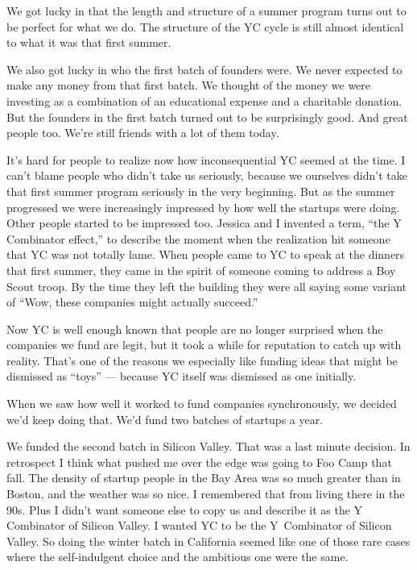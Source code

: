 \documentclass[12pt]{book}
\begin{document}
We got lucky in that the length and structure of a summer program turns
out to be perfect for what we do. The structure of the YC cycle is still
almost identical to what it was that first summer.

We also got lucky in who the first batch of founders were. We never
expected to make any money from that first batch. We thought of the
money we were investing as a combination of an educational expense and a
charitable donation. But the founders in the first batch turned out to
be surprisingly good. And great people too. We're still friends with a
lot of them today.

It's hard for people to realize now how inconsequential YC seemed at the
time. I can't blame people who didn't take us seriously, because we
ourselves didn't take that first summer program seriously in the very
beginning. But as the summer progressed we were increasingly impressed
by how well the startups were doing. Other people started to be
impressed too. Jessica and I invented a term, ``the Y Combinator
effect,'' to describe the moment when the realization hit someone that
YC was not totally lame. When people came to YC to speak at the dinners
that first summer, they came in the spirit of someone coming to address
a Boy Scout troop. By the time they left the building they were all
saying some variant of ``Wow, these companies might actually succeed.''

Now YC is well enough known that people are no longer surprised when the
companies we fund are legit, but it took a while for reputation to catch
up with reality. That's one of the reasons we especially like funding
ideas that might be dismissed as ``toys'' --- because YC itself was
dismissed as one initially.

When we saw how well it worked to fund companies synchronously, we
decided we'd keep doing that. We'd fund two batches of startups a year.

We funded the second batch in Silicon Valley. That was a last minute
decision. In retrospect I think what pushed me over the edge was going
to Foo Camp that fall. The density of startup people in the Bay Area was
so much greater than in Boston, and the weather was so nice. I
remembered that from living there in the 90s. Plus I didn't want someone
else to copy us and describe it as the Y Combinator of Silicon Valley. I
wanted YC to be the Y~Combinator of Silicon Valley. So doing the winter
batch in California seemed like one of those rare cases where the
self-indulgent choice and the ambitious one were the same.
\end{document}
